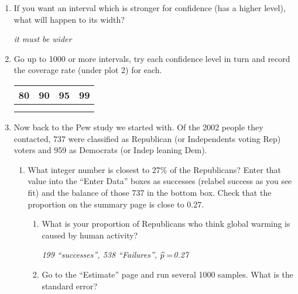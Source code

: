 \begin{enumerate}
\item If you want an interval which is stronger for confidence
  (has a higher level), what will happen to its width?
\begin{students}
  \vspace{.6cm}
\end{students}
\begin{key}
  {\it it must be wider}
\end{key}

  \item Go up to 1000 or more intervals, try each confidence level in
    turn and record the coverage rate   (under plot 2) for each.\\
    \begin{tabular}{|r|r|r|r|} \hline
      {\Large 80} &  {\Large 90} &  {\Large 95} &  {\Large 99}\\ \hline
   {\Large  \phantom{9000} } & {\Large \phantom{9000}  } &  {\Large
     \phantom{9000} } &  {\Large  \phantom{9000} } \\
       & & & \\ \hline
    \end{tabular}

  \item Now back to the Pew study we started with. Of the 2002 people
    they contacted, 737 were classified as Republican (or Independents
    voting Rep) voters and 959 as Democrats (or Indep leaning Dem).
    \begin{enumerate}
    \item What integer number is closest to 27\% of the Republicans?
      Enter that value into the  ``Enter Data'' boxes
      as successes (relabel success as you see fit)  and the balance
      of those 737 in the bottom box. Check that the proportion on the
      summary page is  close to 0.27. 
      \begin{enumerate}
      \item What is your proportion of Republicans who think global
        warming is caused by human activity?
\begin{students}
\vspace{.8cm}
\end{students}

\begin{key}
  {\em 199 ``successes'', 538 ``Failures'', $\widehat{p} = $0.27}
\end{key}
      \item Go to the ``Estimate'' page and run several 1000
        samples. What is the standard error?
\begin{students}
\vspace{.8cm}
\end{students}


\end{enumerate}
\end{enumerate}
\end{enumerate}
